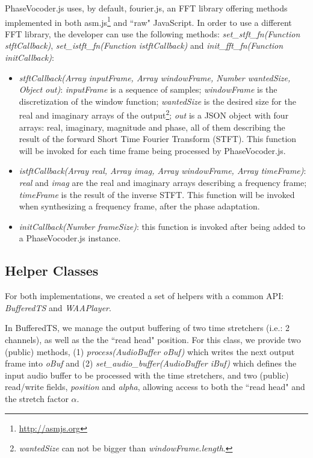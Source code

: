 \documentclass{sig-alternate}
\begin{document}
\begin{sloppypar}
PhaseVocoder.js uses, by default, fourier.js, an FFT library offering methods implemented in both asm.js\footnote{\url{http://asmjs.org}} and  ``raw" JavaScript. In order to use a different FFT library, the developer can use the following methods: \textit{set\_stft\_fn(Function stftCallback)}, \textit{set\_istft\_fn(Function istftCallback)} and \textit{init\_fft\_fn(Function initCallback)}:
\begin{itemize}
	\item \textit{stftCallback(Array inputFrame, Array windowFrame, Number wantedSize, Object out)}: \textit{inputFrame} is a sequence of samples; \textit{windowFrame} is the discretization of the window function; \textit{wantedSize} is the desired size for the real and imaginary arrays of the output\footnote{\textit{wantedSize} can not be bigger than \textit{windowFrame.length}.}; \textit{out} is a JSON object with four arrays: real, imaginary, magnitude and phase, all of them describing the result of the forward Short Time Fourier Transform (STFT). This function will be invoked for each time frame being processed by PhaseVocoder.js.
	\item \textit{istftCallback(Array real, Array imag, Array windowFrame, Array timeFrame)}: \textit{real} and \textit{imag} are the real and imaginary arrays describing a frequency frame; \textit{timeFrame} is the result of the inverse STFT. This function will be invoked when synthesizing a frequency frame, after the phase adaptation.
	\item \textit{initCallback(Number frameSize)}: this function is invoked after being added to a PhaseVocoder.js instance.
\end{itemize}

\subsection{Helper Classes}

For both implementations, we created a set of helpers with a common API: \textit{BufferedTS} and \textit{WAAPlayer}. 

In BufferedTS, we manage the output buffering of two time stretchers (i.e.: 2 channels), as well as the the ``read head" position. For this class, we provide two (public) methods, (1) \textit{process(AudioBuffer oBuf)} which writes the next output frame into \textit{oBuf} and (2) \textit{set\_audio\_buffer(AudioBuffer iBuf)} which defines the input audio buffer to be processed with the time stretchers, and two (public) read/write fields, \textit{position} and \textit{alpha}, allowing access to both the ``read head" and the stretch factor $\alpha$.


\end{sloppypar}
\end{document}
